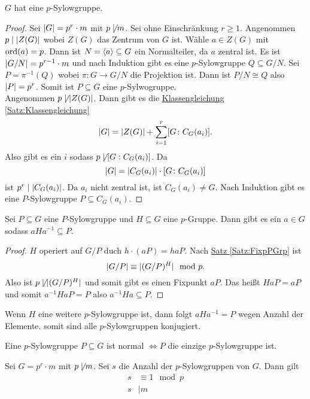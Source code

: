 \begin{Satz}[1. Sylowsatz]
    $G$ hat eine $p$-Sylowgruppe.
\end{Satz}
\begin{proof}
    Sei $\lvert G\rvert=p^r\cdot m$ mit $p\not\mid m$.
    Sei ohne Einschränkung $r\geq 1$.
    Angenommen $p\mid \lvert Z(G)\rvert$ wobei $Z(G)$ das Zentrum von $G$ ist. Wähle $a\in Z(G)$ mit $\operatorname{ord}(a)=p$. Dann ist $N=\langle a\rangle\subseteq G$ ein Normalteiler, da $a$ zentral ist. Es ist $\lvert G/N\rvert=p^{r-1}\cdot m$ und nach Induktion gibt es eine $p$-Sylowgruppe $Q\subseteq G/N$. Sei $P=\pi^{-1}(Q)$ wobei $\pi\colon G\to G/N$ die Projektion ist.
    Dann ist $P/N\cong Q$ also $\lvert P\rvert=p^r$. Somit ist $P\subseteq G$ eine $p$-Sylwogruppe.\\
    Angenommen $p\not\mid \lvert Z(G)\rvert$. Dann gibt es die \hyperref[Satz:Klassengleichung]{Klassengleichung \ref{Satz:Klassengleichung}}
    $$\lvert G\rvert=\lvert Z(G)\rvert+\sum_{i=1}^r[G\colon C_G(a_i)].$$
    Also gibt es ein $i$ sodass $p\not\mid [G:C_G(a_i)]$.
    Da $$\lvert G\rvert=\lvert C_G(a_i)\rvert\cdot [G\colon C_G(a_i)]$$ ist $p^r\mid\lvert C_G(a_i)\rvert$. Da $a_i$ nicht zentral ist, ist $C_G(a_i)\neq G$. Nach Induktion gibt es eine $P$-Sylowgruppe $P\subseteq C_G(a_i)$.
\end{proof} 
\begin{Satz}[2. Sylowsatz]\label{Satz:2Sylow}
Sei $P\subseteq G$ eine $P$-Sylowgruppe und $H\subseteq G$ eine $p$-Gruppe. Dann gibt es ein $a\in G$ sodass $aHa^{-1}\subseteq P$.    
\end{Satz}
\begin{proof}
    $H$ operiert auf $G/P$ duch $h\cdot (aP)=haP$. Nach \hyperref[Satz:FixpPGrp]{Satz \ref{Satz:FixpPGrp}} ist 
    $$\lvert G/P\rvert\equiv \lvert(G/P)^H\rvert\mod p.$$
    Also ist $p\not\mid \lvert(G/P)^H\rvert$ und somit gibt es einen Fixpunkt $aP$. Das heißt $HaP=aP$ und somit $a^{-1}HaP=P$ also $a^{-1}Ha\subseteq P$.
\end{proof}
\begin{Kor}
    Wenn $H$ eine weitere $p$-Sylowgruppe ist, dann folgt $aHa^{-1}=P$ wegen Anzahl der Elemente. somit sind alle $p$-Sylowgruppen konjugiert.
\end{Kor}
\begin{Bem}
    Eine $p$-Sylowgruppe $P\subseteq G$ ist normal $\iff P$ die einzige $p$-Sylowgruppe ist.
\end{Bem}
\begin{Satz}[3. Sylowsatz]\label{Satz:3Sylow}
    Sei $G=p^r\cdot m$ mit $p\not \mid m$. Sei $s$ die Anzahl der $p$-Sylowgruppen von $G$. Dann gilt
    \begin{align}
        s&\equiv 1\mod p\\
        s&\mid m
    \end{align}
\end{Satz}
